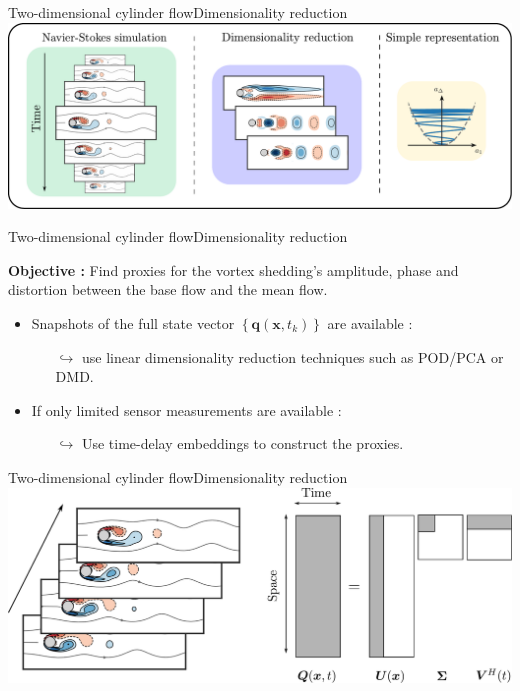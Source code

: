 \documentclass[usenames,dvipsnames,svgnames,10pt,aspectratio=169]{beamer}
\begin{document}
\begin{frame}[t, c]{Two-dimensional cylinder flow}{Dimensionality reduction}
  \centering
  \includegraphics[width=.8\textwidth]{reduced_order_modeling}
\end{frame}




\begin{frame}[t, c]{Two-dimensional cylinder flow}{Dimensionality reduction}
  \begin{tcolorbox}[colback=white, colframe=beamer@kthblue]
    \textbf{Objective :} Find proxies for the vortex shedding's amplitude, phase and distortion between the base flow and the mean flow.
  \end{tcolorbox}
  
  \bigskip
  
  \begin{itemize}
  \item Snapshots of the full state vector $\left\{ \bm{q}(\bm{x}, t_k) \right\}$ are available :
    \begin{itemize}
    \item[$\hookrightarrow$] use linear dimensionality reduction techniques such as POD/PCA or DMD.
    \end{itemize}
    
    \medskip
    
  \item If only limited sensor measurements are available :
    \begin{itemize}
    \item[$\hookrightarrow$] Use time-delay embeddings to construct the proxies.
    \end{itemize}
  \end{itemize}
\end{frame}




\begin{frame}[t, c]{Two-dimensional cylinder flow}{Dimensionality reduction}
  \centering
  \includegraphics[width=.8\textwidth]{svd_pod}
\end{frame}
\end{document}
